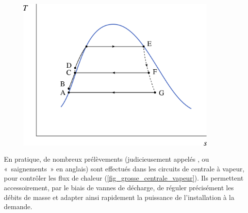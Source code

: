 		\begin{figure}
			\begin{center}
				\includegraphics[width=10cm]{images/ts_lv_prelevement.png}
			\end{center}
			\label{fig_ts_lv_prelevement_vapeur}
		\end{figure}

		En pratique, de nombreux prélèvements (judicieusement appelés , ou «~saignements~» en anglais) sont effectués dans les circuits de centrale à vapeur, pour contrôler les flux de chaleur (\cref{fig_grosse_centrale_vapeur}). Ils permettent accessoirement, par le biais de vannes de décharge, de réguler précisément les débits de masse et adapter ainsi rapidement la puissance de l’installation à la demande.

